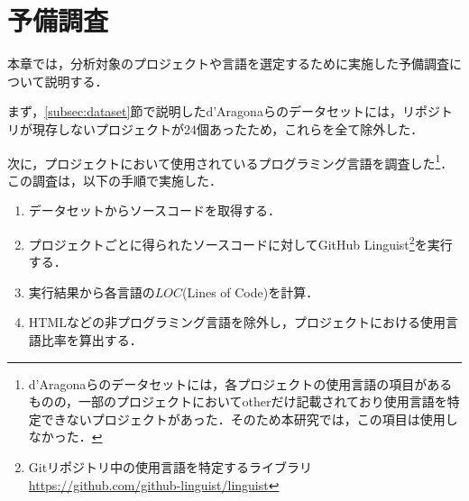 \documentclass[T,J]{fose}
\begin{document}
\section{予備調査} \label{sec:preliminary}
本章では，分析対象のプロジェクトや言語を選定するために実施した予備調査について説明する．

まず，\ref{subsec:dataset}節で説明したd'Aragonaらのデータセットには，リポジトリが現存しないプロジェクトが24個あったため，これらを全て除外した．


次に，プロジェクトにおいて使用されているプログラミング言語を調査した\footnote{d'Aragonaらのデータセットには，各プロジェクトの使用言語の項目があるものの，一部のプロジェクトにおいて{\sf other}だけ記載されており使用言語を特定できないプロジェクトがあった．そのため本研究では，この項目は使用しなかった．}．
この調査は，以下の手順で実施した．
\begin{enumerate}
    \item データセットからソースコードを取得する．
    \item プロジェクトごとに得られたソースコードに対してGitHub Linguist\footnote{Gitリポジトリ中の使用言語を特定するライブラリ \url{https://github.com/github-linguist/linguist}}を実行する．
    \item 実行結果から各言語の$LOC$(Lines of Code)を計算．
    \item HTMLなどの非プログラミング言語を除外し，プロジェクトにおける使用言語比率を算出する．
\end{enumerate}
\end{document}
